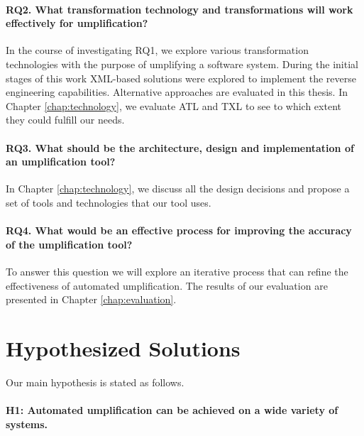 \paragraph*{RQ2. What transformation technology and transformations  will work effectively for umplification?}

In the course of investigating RQ1, we explore various transformation technologies with the purpose of umplifying a software system. During the initial stages of this work \cite{DoctoralSymposiumWCRE} XML-based solutions were explored to implement the reverse engineering capabilities. Alternative approaches are evaluated in this thesis. In Chapter \ref{chap:technology}, we evaluate ATL and TXL to see to which extent they could fulfill our needs. 


\paragraph*{RQ3. What should be the architecture, design and implementation of an umplification tool?}

In Chapter \ref{chap:technology}, we discuss all the design decisions and propose a set of tools and technologies that our  tool uses.

\paragraph*{RQ4. What would be an effective process for improving the accuracy of the umplification tool?}

To answer this question we will explore an iterative process that can refine the effectiveness of automated umplification. The results of our evaluation are presented in Chapter \ref{chap:evaluation}.

\section{Hypothesized Solutions}

Our main hypothesis is stated as follows.

\paragraph*{H1: Automated umplification can be achieved on a wide variety of systems.}

